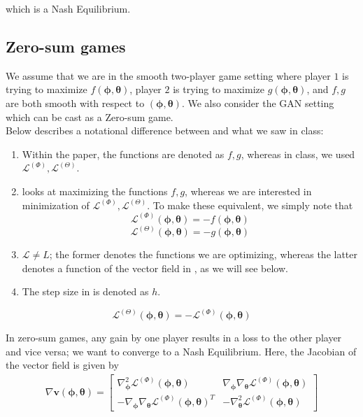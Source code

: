\documentclass{article}
\renewcommand{\vec}[1]{\ensuremath{\boldsymbol{#1}}}
\newcommand{\phth}[0]{\ensuremath{(\boldsymbol{\phi}, \boldsymbol{\theta})}}
\begin{document}
which is a Nash Equilibrium.

\subsection{Zero-sum games}
We assume that we are in the smooth two-player game setting where player $1$ is trying to maximize $f(\vec{\phi}, \vec{\theta})$, player $2$ is trying to maximize $g(\vec{\phi}, \vec{\theta})$, and $f,g$ are both smooth with respect to $\phth$. We also consider the GAN setting which can be cast as a Zero-sum game.
\\

Below describes a notational difference between \cite{MeschederNG17a} and what we saw in class:

\begin{enumerate}
    \item Within the paper, the functions are denoted as $f, g$, whereas in class, we used $\mathcal{L}^{(\Phi)}, \mathcal{L}^{(\Theta)}$. 
    \item \cite{MeschederNG17a} looks at maximizing the functions $f, g$, whereas we are interested in minimization of $\mathcal{L}^{(\Phi)}, \mathcal{L}^{(\Theta)}$. To make these equivalent, we simply note that $$\mathcal{L}^{(\Phi)}(\vec{\phi}, \vec{\theta}) = -f(\vec{\phi}, \vec{\theta})$$
    $$\mathcal{L}^{(\Theta)}(\vec{\phi}, \vec{\theta}) = -g(\vec{\phi}, \vec{\theta})$$
    \item $\mathcal{L} \neq L$; the former denotes the functions we are optimizing, whereas the latter denotes a function of the vector field in \cite{MeschederNG17a}, as we will see below.
    \item The step size in \cite{MeschederNG17a} is denoted as $h$. 
\end{enumerate}

\begin{defn}
\[
    \mathcal{L}^{(\Theta)}(\vec{\phi},\vec{\theta}) = - \mathcal{L}^{(\Phi)}(\vec{\phi},\vec{\theta})
\]
\end{defn}
In zero-sum games, any gain by one player results in a loss to the other player and vice versa; we want to converge to a Nash Equilibrium. Here, the Jacobian of the vector field is given by
\begin{align}
    \nabla\vec{v}\phth= 
    \begin{bmatrix} 
        \nabla^2_{\vec{\phi}} \mathcal{L}^{(\Phi)}(\vec{\phi}, \vec{\theta}) & \nabla_{\vec{\phi}}\nabla_{\vec{\theta}} \mathcal{L}^{(\Phi)}(\vec{\phi}, \vec{\theta}) \\
        - \nabla_{\vec{\phi}}\nabla_{\vec{\theta}} \mathcal{L}^{(\Phi)}(\vec{\phi}, \vec{\theta})^T & - \nabla^2_{\vec{\theta}} \mathcal{L}^{(\Phi)}(\vec{\phi}, \vec{\theta}) 
    \end{bmatrix}
\end{align} 
\end{document}
